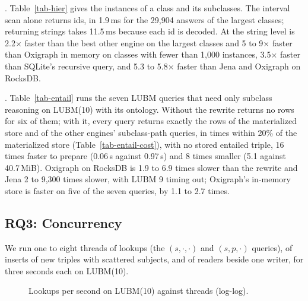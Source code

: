 



.
Table~\ref{tab-hier} gives the instances of a class and its subclasses.
The interval scan alone returns ids, in 1.9\,ms for the 29,904 answers of the
largest classes; returning strings takes 11.5\,ms because each id is decoded.
At the string level \sys is 2.2$\times$ faster than the best other engine on the
largest classes and 5 to 9$\times$ faster than Oxigraph in memory on classes with
fewer than 1,000 instances, 3.5$\times$ faster than SQLite's recursive query, and
5.3 to 5.8$\times$ faster than Jena and Oxigraph on RocksDB.

.
Table~\ref{tab-entail} runs the seven LUBM queries that need only subclass
reasoning on LUBM(10) with its ontology.
Without the rewrite \sys returns no rows for six of them; with it, every query
returns exactly the rows of the materialized store and of the other engines'
subclass-path queries, in times within 20\% of the materialized store
(Table~\ref{tab-entail-cost}), with no stored entailed triple, 16 times faster to
prepare (0.06\,s against 0.97\,s) and 8 times smaller (5.1 against 40.7\,MiB).
Oxigraph on RocksDB is 1.9 to 6.9 times slower than the rewrite and Jena 2 to
9,300 times slower, with LUBM 9 timing out; Oxigraph's in-memory store is faster
on five of the seven queries, by 1.1 to 2.7 times.





\subsection{RQ3: Concurrency}

We run one to eight threads of lookups (the $(s,\cdot,\cdot)$ and
$(s,p,\cdot)$ queries), of inserts of new triples with scattered subjects, and of
readers beside one writer, for three seconds each on LUBM(10).

\begin{figure}[t]
\centering

\caption{Lookups per second on LUBM(10) against threads (log-log).}
\label{fig-conc}
\end{figure}



